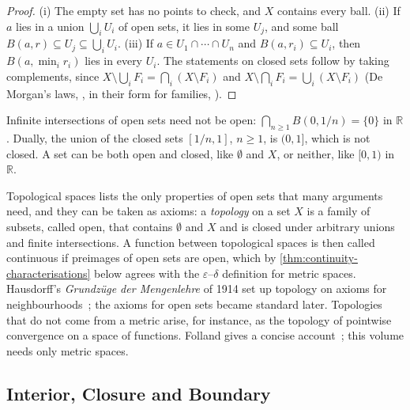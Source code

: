 \begin{proof}
(i) The empty set has no points to check, and $X$ contains every ball. (ii) If $a$ lies in a union $\bigcup_iU_i$ of open sets, it lies in some $U_j$, and some ball $B(a,r)\subseteq U_j\subseteq\bigcup_iU_i$. (iii) If $a\in U_1\cap\cdots\cap U_n$ and $B(a,r_i)\subseteq U_i$, then $B(a,\min_ir_i)$ lies in every $U_i$. The statements on closed sets follow by taking complements, since $X\setminus\bigcup_iF_i=\bigcap_i(X\setminus F_i)$ and $X\setminus\bigcap_iF_i=\bigcup_i(X\setminus F_i)$ (De Morgan's laws, , in their form for families, ).
\end{proof}

Infinite intersections of open sets need not be open: $\bigcap_{n\ge1}B(0,1/n)=\{0\}$ in $\mathbb R$. Dually, the union of the closed sets $[1/n,1]$, $n\ge1$, is $(0,1]$, which is not closed. A set can be both open and closed, like $\emptyset$ and $X$, or neither, like $[0,1)$ in $\mathbb R$.

\begin{note}{Topological spaces}
 lists the only properties of open sets that many arguments need, and they can be taken as axioms: a \emph{topology} on a set $X$ is a family of subsets, called open, that contains $\emptyset$ and $X$ and is closed under arbitrary unions and finite intersections. A function between topological spaces is then called continuous if preimages of open sets are open, which by \cref{thm:continuity-characterisations} below agrees with the $\varepsilon$--$\delta$ definition for metric spaces. Hausdorff's \emph{Grundz\"uge der Mengenlehre} of 1914 set up topology on axioms for neighbourhoods~\cite{hausdorff1914}; the axioms for open sets became standard later. Topologies that do not come from a metric arise, for instance, as the topology of pointwise convergence on a space of functions. Folland gives a concise account~\cite[Chap.~4]{folland1999}; this volume needs only metric spaces.
\end{note}

\subsection{Interior, Closure and Boundary}


